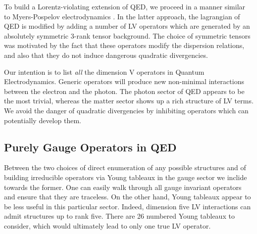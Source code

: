 \documentclass[12pt,preprintnumbers,nofootinbib]{revtex4}
\begin{document}
	To build a Lorentz-violating extension of QED, we proceed in a manner
	similar to Myers-Pospelov electrodynamics
\cite{MP:}.
	In the latter approach, the lagrangian of QED is modified by adding
	a number of LV operators which are generated by an absolutely
	symmetric 3-rank tensor background.
	The choice of symmetric tensors was motivated by the fact that
	these operators modify the dispersion relations, and also that
	they do not induce dangerous quadratic divergencies.

	Our intention is to list {\it all} the dimension V operators in 
	Quantum Electrodynamics. 
	Generic operators will produce new non-minimal interactions between
	the electron and the photon. 
	The photon sector of QED appears to be the most trivial, whereas
	the matter sector shows up a rich structure of LV terms.
	We avoid the danger of quadratic divergencies by inhibiting operators
	which can potentially develop them.

\subsection{Purely Gauge Operators in QED}

	Between the two choices of direct enumeration of any possible structures
	and of building irreducible operators via Young tableaux in the gauge sector 
	we inclide towards the former.
	One can easily walk through all gauge invariant operators and ensure that
	they are traceless.
	On the other hand, Young tableaux appear to be less useful in this particular
	sector.
	Indeed, dimension five LV interactions can admit structures up to rank five.
	There are 26 numbered Young tableaux to consider, which would 
	ultimately lead to only one true LV operator.
\end{document}
